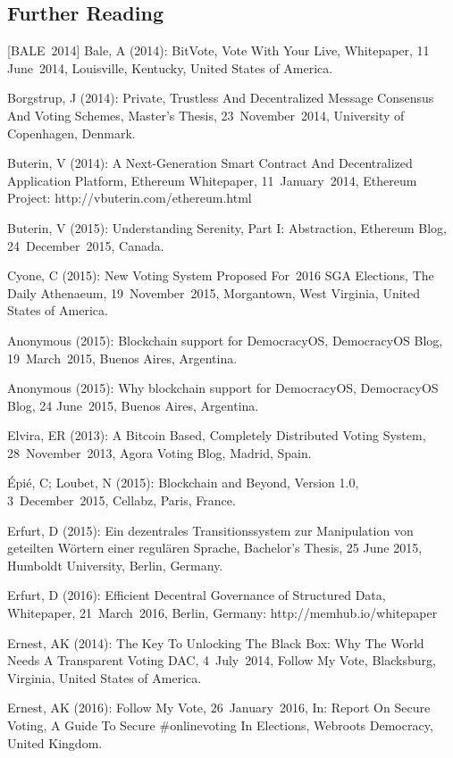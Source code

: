 \documentclass[9pt,oneside]{amsart}
\begin{document}
\begin{multicols}{2}
\section{Further Reading}
[BALE~2014] Bale, A (2014): BitVote, Vote With Your Live, Whitepaper, 11 June~2014, Louisville, Kentucky, United States of America.\par
[BORGSTRUP~2014] Borgstrup, J (2014): Private, Trustless And Decentralized Message Consensus And Voting Schemes, Master's Thesis, 23~November~2014, University of Copenhagen, Denmark.\par
[BUTERIN~2014] Buterin, V (2014): A Next-Generation Smart Contract And Decentralized Application Platform, Ethereum Whitepaper, 11~January~2014, Ethereum Project: http://vbuterin.com/ethereum.html\par
[BUTERIN~2015] Buterin, V (2015): Understanding Serenity, Part I: Abstraction, Ethereum Blog, 24~December~2015, Canada.\par
[COYNE~2015] Cyone, C (2015): New Voting System Proposed For~2016 SGA Elections, The Daily Athenaeum, 19~November~2015, Morgantown, West Virginia, United States of America.\par
[DEMOCRACYOS~2015A] Anonymous (2015): Blockchain support for DemocracyOS, DemocracyOS Blog, 19~March~2015, Buenos Aires, Argentina.\par
[DEMOCRACYOS~2015B] Anonymous (2015): Why blockchain support for DemocracyOS, DemocracyOS Blog, 24 June~2015, Buenos Aires, Argentina.\par
[ELVIRA~2013] Elvira, ER (2013): A Bitcoin Based, Completely Distributed Voting System, 28~November~2013, Agora Voting Blog, Madrid, Spain.\par
[ÉPIÉ~et~al.~2015] Épié, C; Loubet, N (2015): Blockchain and Beyond, Version 1.0, 3~December~2015, Cellabz, Paris, France.\par
[ERFURT~2015] Erfurt, D (2015): Ein dezentrales Transitionssystem zur Manipulation von geteilten Wörtern einer regulären Sprache, Bachelor's Thesis, 25 June 2015, Humboldt University, Berlin, Germany.\par
[ERFURT~2016] Erfurt, D (2016): Efficient Decentral Governance of Structured Data, Whitepaper, 21~March~2016, Berlin, Germany: http://memhub.io/whitepaper\par
[ERNEST~2014] Ernest, AK (2014): The Key To Unlocking The Black Box: Why The World Needs A Transparent Voting DAC, 4~July~2014, Follow My Vote, Blacksburg, Virginia, United States of America.\par
[ERNEST~2016] Ernest, AK (2016): Follow My Vote, 26~January~2016, In: Report On Secure Voting, A Guide To Secure \#onlinevoting In Elections, Webroots Democracy, United Kingdom.\par

\end{multicols}
\end{document}
